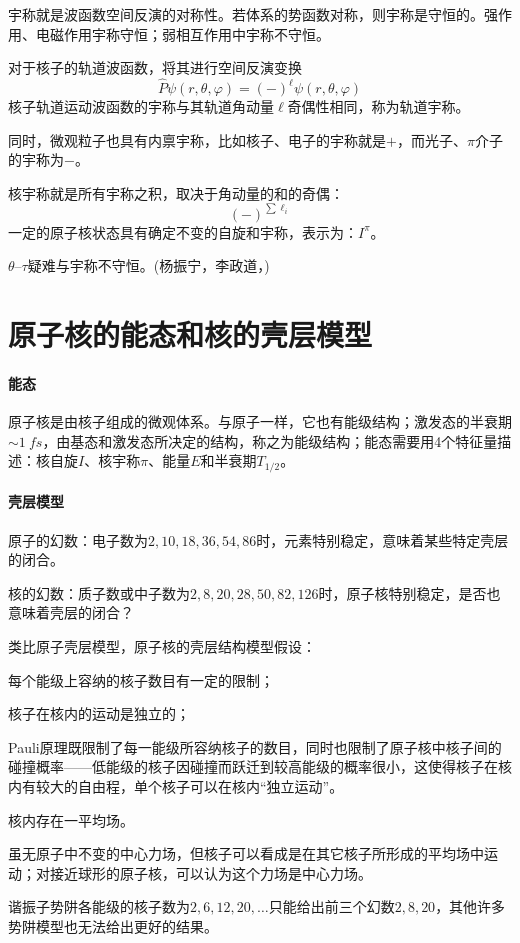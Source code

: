 宇称就是波函数空间反演的对称性。若体系的势函数对称，则宇称是守恒的。强作用、电磁作用宇称守恒；弱相互作用中宇称不守恒。

对于核子的轨道波函数，将其进行空间反演变换
\begin{equation}\label{eq:nrd-orbital-parity}
	\hat P\psi(r,\theta,\varphi) = (-)^\ell\psi(r,\theta,\varphi)
\end{equation}
核子轨道运动波函数的宇称与其轨道角动量$\ell$奇偶性相同，称为轨道宇称。

同时，微观粒子也具有内禀宇称，比如核子、电子的宇称就是$+$，而光子、$\pi$介子的宇称为$-$。

核宇称就是所有宇称之积，取决于角动量的和的奇偶：
\begin{equation}\label{eq:nrd-nuclear-parity}
	(-)^{\sum\ell_i}
\end{equation}
一定的原子核状态具有确定不变的自旋和宇称，表示为：$I^\pi$。

$\theta$--$\tau$疑难与宇称不守恒。(杨振宁，李政道，)

\section{原子核的能态和核的壳层模型}

\paragraph{能态}原子核是由核子组成的微观体系。与原子一样，它也有能级结构；激发态的半衰期$\sim \qty{1}{fs}$，由基态和激发态所决定的结构，称之为能级结构；能态需要用4个特征量描述：核自旋$I$、核宇称$\pi$、能量$E$和半衰期$T_{1/2}$。
\begin{notecaptionblock}
\end{notecaptionblock}
\paragraph{壳层模型}原子的幻数：电子数为$2,10,18,36,54,86$时，元素特别稳定，意味着某些特定壳层的闭合。

核的幻数：质子数或中子数为$2,8,20,28,50,82,126$时，原子核特别稳定，是否也意味着壳层的闭合？

类比原子壳层模型，原子核的壳层结构模型假设：
\begin{compactenum}
	\item 每个能级上容纳的核子数目有一定的限制；
	\item 核子在核内的运动是独立的；

	Pauli原理既限制了每一能级所容纳核子的数目，同时也限制了原子核中核子间的碰撞概率——低能级的核子因碰撞而跃迁到较高能级的概率很小，这使得核子在核内有较大的自由程，单个核子可以在核内“独立运动”。
	\item 核内存在一平均场。

	虽无原子中不变的中心力场，但核子可以看成是在其它核子所形成的平均场中运动；对接近球形的原子核，可以认为这个力场是中心力场。
\end{compactenum}
谐振子势阱各能级的核子数为$2,6,12,20,\ldots$只能给出前三个幻数$2,8,20$，其他许多势阱模型也无法给出更好的结果。

